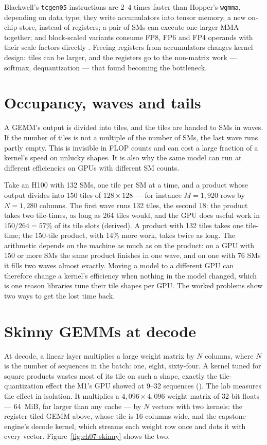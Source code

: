 Blackwell's \texttt{tcgen05} instructions are 2--4 times faster than Hopper's
\texttt{wgmma}, depending on data type; they write accumulators into tensor
memory, a new on-chip store, instead of registers; a pair of SMs can execute
one larger MMA together; and block-scaled variants consume FP8, FP6 and FP4
operands with their scale factors directly \cite{nvidia2026cutlassblackwell}.
Freeing registers from accumulators changes kernel design: tiles can be larger,
and the registers go to the non-matrix work --- softmax, dequantization ---
that  found becoming the bottleneck.

\section{Occupancy, waves and tails}

A GEMM's output is divided into tiles, and the tiles are handed to SMs in
waves. If the number of tiles is not a multiple of the number of SMs, the
last wave runs partly empty. This  is invisible in FLOP
counts and can cost a large fraction of a kernel's speed on unlucky shapes. It
is also why the same model can run at different efficiencies on GPUs with
different SM counts.

Take an H100 with 132 SMs, one tile per SM at a time, and a product whose output
divides into 150 tiles of $128 \times 128$ --- for instance $M = 1{,}920$ rows by
$N = 1{,}280$ columns. The first wave runs 132 tiles, the second 18: the product
takes two tile-times, as long as 264 tiles would, and the GPU does useful work
in $150/264 = 57\%$ of its tile slots (derived). A product with 132 tiles takes
one tile-time; the 150-tile product, with 14\% more work, takes twice as long.
The arithmetic depends on the machine as much as on the product: on a GPU with 150
or more SMs the same product finishes in one wave, and on one with 76 SMs it fills
two waves almost exactly. Moving a model to a different GPU can therefore change a
kernel's efficiency when nothing in the model changed, which is one reason
libraries tune their tile shapes per GPU. The worked problems show two ways to get
the lost time back.

\section{Skinny GEMMs at decode}

At decode, a linear layer multiplies a large weight matrix by $N$ columns,
where $N$ is the number of sequences in the batch: one, eight, sixty-four. A
kernel tuned for square products wastes most of its tile on such a shape,
exactly the tile-quantization effect the M1's GPU showed at 9--32 sequences
(). The lab measures the effect in isolation. It multiplies a
$4{,}096 \times 4{,}096$ weight matrix of 32-bit floats --- 64~MiB, far larger than
any cache --- by $N$ vectors with two kernels: the register-tiled GEMM above,
whose tile is 16 columns wide, and the capstone engine's decode kernel, which
streams each weight row once and dots it with every vector.
Figure~\ref{fig:ch07-skinny} shows the two.

